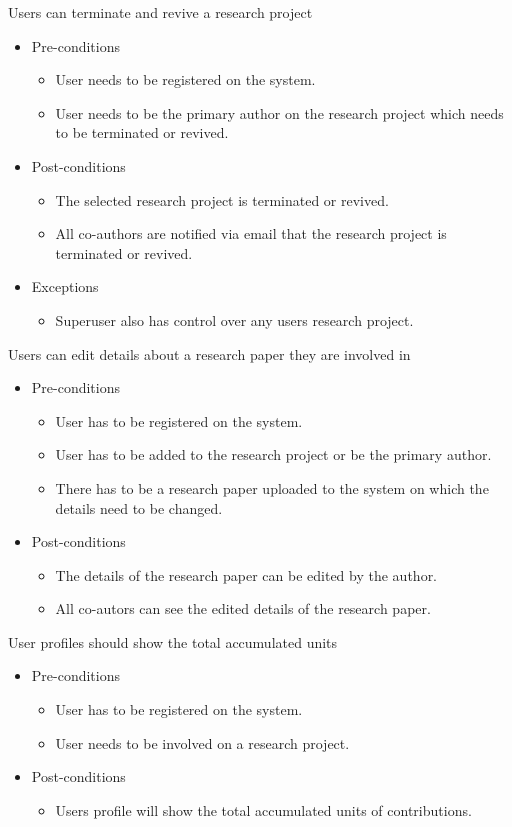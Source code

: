 \documentclass[a4paper,12pt]{report}
\begin{document}
	Users can terminate and revive a research project
	\begin{itemize}
		\item Pre-conditions
			\begin{itemize}
				\item User needs to be registered on the system.
				\item User needs to be the primary author on the research project which needs to be terminated or revived.
			\end{itemize}
		\item Post-conditions
			\begin{itemize}
				\item The selected research project is terminated or revived.
				\item All co-authors are notified via email that the research project is terminated or revived.
			\end{itemize}
		\item Exceptions
			\begin{itemize}
				\item Superuser also has control over any users research project.
			\end{itemize}
	\end{itemize}

	Users can edit details about a research paper they are involved in
	\begin{itemize}
		\item Pre-conditions
			\begin{itemize}
				\item User has to be registered on the system.
				\item User has to be added to the research project or be the primary author.
				\item There has to be a research paper uploaded to the system on which the details need to be changed.
			\end{itemize}
		\item Post-conditions
			\begin{itemize}
				\item The details of the research paper can be edited by the author.
				\item All co-autors can see the edited details of the research paper.
			\end{itemize}
	\end{itemize}

	User profiles should show the total accumulated units
	\begin{itemize}
		\item Pre-conditions
			\begin{itemize}
				\item User has to be registered on the system.
				\item User needs to be involved on a research project.
			\end{itemize}
		\item Post-conditions
			\begin{itemize}
				\item Users profile will show the total accumulated units of contributions.
			\end{itemize}
	\end{itemize}
\end{document}
